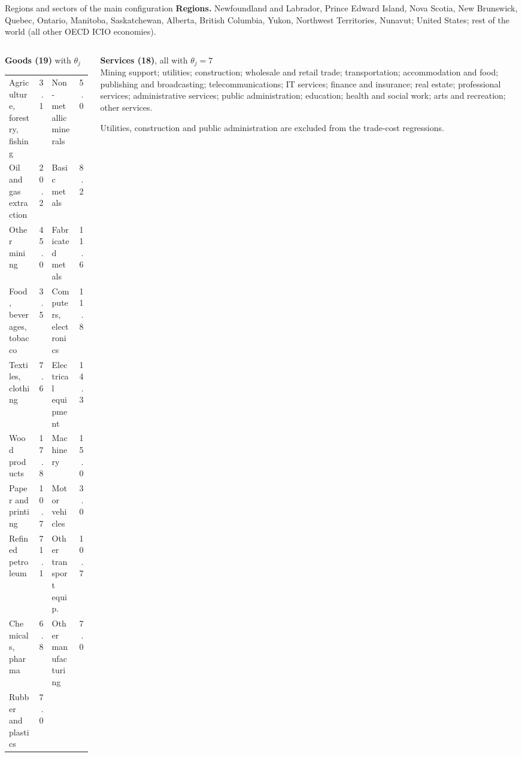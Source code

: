 \documentclass[aspectratio=169,9pt,t]{beamer}
\begin{document}
\begin{frame}{Regions and sectors of the main configuration}
  \footnotesize
  \textbf{Regions.} Newfoundland and Labrador, Prince Edward Island, Nova
  Scotia, New Brunswick, Quebec, Ontario, Manitoba, Saskatchewan, Alberta,
  British Columbia, Yukon, Northwest Territories, Nunavut; United States;
  rest of the world (all other OECD ICIO economies).

  \medskip
  \begin{columns}[T]
    \begin{column}{0.6\textwidth}
      \textbf{Goods (19)} with $\theta_j$\\[0.2em]
      \begin{tabular}{@{}lr@{\hspace{1.2em}}lr@{}}
        Agriculture, forestry, fishing & 3.1 & Non-metallic minerals & 5.0\\
        Oil and gas extraction & 20.2 & Basic metals & 8.2\\
        Other mining & 45.0 & Fabricated metals & 11.6\\
        Food, beverages, tobacco & 3.5 & Computers, electronics & 11.8\\
        Textiles, clothing & 7.6 & Electrical equipment & 14.3\\
        Wood products & 17.8 & Machinery & 15.0\\
        Paper and printing & 10.7 & Motor vehicles & 3.0\\
        Refined petroleum & 71.1 & Other transport equip. & 10.7\\
        Chemicals, pharma & 6.8 & Other manufacturing & 7.0\\
        Rubber and plastics & 7.0 & & \\
      \end{tabular}
    \end{column}
    \begin{column}{0.36\textwidth}
      \textbf{Services (18)}, all with $\theta_j=7$\\[0.2em]
      Mining support; utilities; construction; wholesale and retail trade;
      transportation; accommodation and food; publishing and broadcasting;
      telecommunications; IT services; finance and insurance; real estate;
      professional services; administrative services; public
      administration; education; health and social work; arts and
      recreation; other services.

      \medskip
      Utilities, construction and public administration are excluded from
      the trade-cost regressions.
    \end{column}
  \end{columns}
\end{frame}
\end{document}
